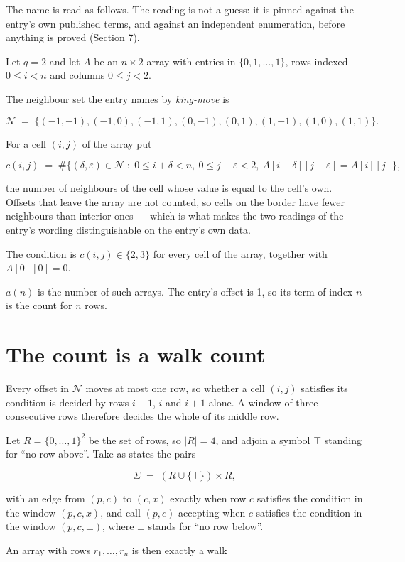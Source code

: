 \documentclass[11pt]{article}
\theoremstyle{definition}
\begin{document}
The name is read as follows. The reading is not a guess: it is pinned against the entry's own published terms, and against an independent enumeration, before anything is proved (Section 7).

Let $q = 2$ and let $A$ be an $n \times 2$ array with entries in $\{0,1,\dots,1\}$, rows indexed $0 \le i < n$ and columns $0 \le j < 2$.

The neighbour set the entry names by {\itshape king-move} is

\[\mathcal{N} \;=\; \{(-1,-1), (-1,0), (-1,1), (0,-1), (0,1), (1,-1), (1,0), (1,1)\}.\]

For a cell $(i,j)$ of the array put

\[c(i,j) \;=\; \#\bigl\{(\delta,\varepsilon)\in\mathcal{N} \;:\; 0\le i+\delta<n,\ 0\le j+\varepsilon<2,\ A[i+\delta][j+\varepsilon] = A[i][j]\bigr\},\]

the number of neighbours of the cell whose value is equal to the cell's own. Offsets that leave the array are not counted, so cells on the border have fewer neighbours than interior ones --- which is what makes the two readings of the entry's wording distinguishable on the entry's own data.

The condition is $c(i,j) \in \{2, 3\}$ for every cell of the array, together with $A[0][0]=0$.

$a(n)$ is the number of such arrays. The entry's offset is 1, so its term of index $n$ is the count for $n$ rows.

\section{The count is a walk count}

Every offset in $\mathcal{N}$ moves at most one row, so whether a cell $(i,j)$ satisfies its condition is decided by rows $i-1$, $i$ and $i+1$ alone. A window of three consecutive rows therefore decides the whole of its middle row.

Let $R = \{0,\dots,1\}^{2}$ be the set of rows, so $|R| = 4$, and adjoin a symbol $\top$ standing for ``no row above''. Take as states the pairs

\[\Sigma \;=\; (R \cup \{\top\}) \times R,\]

with an edge from $(p,c)$ to $(c,x)$ exactly when row $c$ satisfies the condition in the window $(p,c,x)$, and call $(p,c)$ accepting when $c$ satisfies the condition in the window $(p,c,\bot)$, where $\bot$ stands for ``no row below''.

An array with rows $r_1,\dots,r_n$ is then exactly a walk
\end{document}
